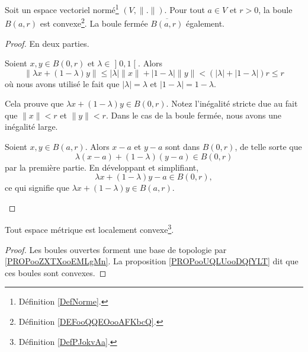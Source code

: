 \begin{proposition}     \label{PROPooUQLUooDQfYLT}
	Soit un espace vectoriel normé\footnote{Définition \ref{DefNorme}.} \( (V,\| . \|)\). Pour tout \( a\in V\) et \( r>0\), la boule \( B(a,r)\) est convexe\footnote{Définition \ref{DEFooQQEOooAFKbcQ}.}. La boule fermée \( \overline{ B(a,r) }\) également.
\end{proposition}

\begin{proof}
	En deux parties.
	\begin{subproof}
		Soient \( x,y\in B(0,r)\) et \( \lambda\in\mathopen] 0 , 1 \mathclose[\). Alors
		\begin{equation}
			\| \lambda x+(1-\lambda)y \|\leq | \lambda |\| x \|+| 1-\lambda |\| y \|< (| \lambda | +| 1-\lambda |)r\leq r
		\end{equation}
		où nous avons utilisé le fait que \( | \lambda |=\lambda\) et \( | 1-\lambda |=1-\lambda\).

		Cela prouve que \( \lambda x+(1-\lambda)y\in B(0,r)\). Notez l'inégalité stricte due au fait que \( \| x \|<r\) et \( \| y \|<r\). Dans le cas de la boule fermée, nous avons une inégalité large.


		Soient \( x,y\in B(a,r)\). Alors \( x-a\) et \( y-a\) sont dans \( B(0,r)\), de telle sorte que
		\begin{equation}
			\lambda(x-a)+(1-\lambda)(y-a)\in B(0,r)
		\end{equation}
		par la première partie. En développant et simplifiant,
		\begin{equation}
			\lambda x+(1-\lambda)y-a\in B(0,r),
		\end{equation}
		ce qui signifie que \( \lambda x+(1-\lambda)y\in B(a,r)\).
	\end{subproof}
\end{proof}


\begin{proposition}		\label{PROPooBVWIooZocheH}
	Tout espace métrique est localement convexe\footnote{Définition \ref{DefPJokvAa}.}.
\end{proposition}

\begin{proof}
	Les boules ouvertes forment une base de topologie par \ref{PROPooZXTXooEMLgMn}. La proposition \ref{PROPooUQLUooDQfYLT} dit que ces boules sont convexes.
\end{proof}

